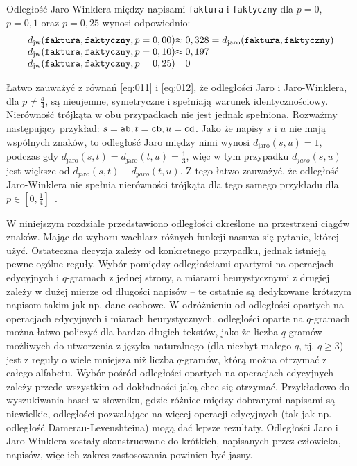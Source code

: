 \documentclass{praca1}
\begin{document}
\begin{example}
Odległość Jaro-Winklera między napisami \verb|faktura| i \verb|faktyczny| dla $p = 0$, $p = 0,1$ oraz $p = 0,25$ wynosi odpowiednio: 
\begin{equation*}
  \left.\begin{array}{l@{}l}
    d_{\mathrm{jw}}(\verb|faktura|, \verb|faktyczny|, p = 0,00) & \approx 0,328 = d_{\mathrm{jaro}}(\verb|faktura|, \verb|faktyczny|) \\
    d_{\mathrm{jw}}(\verb|faktura|, \verb|faktyczny|, p = 0,10) & \approx 0,197  \\
    d_{\mathrm{jw}}(\verb|faktura|, \verb|faktyczny|, p = 0,25) & =  0
  \end{array}\right.
\end{equation*}
\end{example}

Łatwo zauważyć z równań \eqref{eq:011} i \eqref{eq:012}, że odległości Jaro i Jaro-Winklera, dla $p \neq \frac{a}{4}$, są nieujemne,  symetryczne i spełniają warunek identycznościowy. Nierówność trójkąta w obu przypadkach nie jest jednak spełniona. Rozważmy następujący przykład: $s = \verb|ab|, t = \verb|cb|, u = \verb|cd|$. Jako że napisy $s$ i $u$ nie mają wspólnych znaków, to odległość Jaro między nimi wynosi $d_{\mathrm{jaro}}(s, u) = 1$, podczas gdy $d_{\mathrm{jaro}}(s, t) = d_{\mathrm{jaro}}(t, u) = \frac{1}{3}$, więc w tym przypadku $d_{jaro}(s, u)$ jest większe od $d_{\mathrm{jaro}}(s, t) + d_{jaro}(t, u)$. Z tego łatwo zauważyć, że odległość Jaro-Winklera nie spełnia nierówności trójkąta  dla tego samego przykładu dla $p \in [0, \frac{1}{4}]$~\cite{Loo2014:stringdist}.


W niniejszym rozdziale przedstawiono odległości określone na przestrzeni ciągów znaków. Mając do wyboru wachlarz różnych funkcji nasuwa się pytanie, której użyć. Ostateczna decyzja zależy od konkretnego przypadku, jednak istnieją pewne ogólne reguły. Wybór pomiędzy odległościami opartymi na operacjach edycyjnych i $q$-gramach z jednej strony, a miarami heurystycznymi z drugiej zależy w dużej mierze od długości napisów -- te ostatnie są dedykowane krótszym napisom takim jak np. dane osobowe. W odróżnieniu od odległości opartych na operacjach edycyjnych i miarach heurystycznych, odległości oparte na $q$-gramach można łatwo policzyć dla bardzo długich tekstów, jako że liczba $q$-gramów możliwych do utworzenia z języka naturalnego (dla niezbyt małego $q$, tj. $q \geq 3$) jest z reguły o wiele mniejsza niż liczba $q$-gramów, którą można otrzymać z całego alfabetu. Wybór pośród odległości opartych na operacjach edycyjnych zależy przede wszystkim od dokładności jaką chce się otrzymać. Przykładowo do wyszukiwania haseł w słowniku, gdzie różnice między dobranymi napisami są niewielkie, odległości pozwalające na więcej operacji edycyjnych (tak jak np. odległość Damerau-Levenshteina) mogą dać lepsze rezultaty. Odległości Jaro i Jaro-Winklera zostały skonstruowane do krótkich, napisanych przez człowieka, napisów, więc ich zakres zastosowania powinien być jasny.
\end{document}
